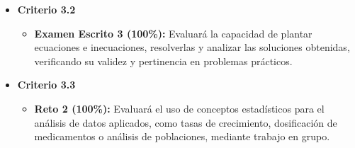 \documentclass[a4,11pt]{aleph-notas}
\begin{document}
\begin{itemize}[leftmargin=*]
    \item \textbf{Criterio 3.2}
        \begin{itemize}[leftmargin=*]
            \item \textbf{Examen Escrito 3 (100\%):} Evaluará la capacidad de plantar ecuaciones e inecuaciones, resolverlas y analizar las soluciones obtenidas, verificando su validez y pertinencia en problemas prácticos.
        \end{itemize}

    \item \textbf{Criterio 3.3}
        \begin{itemize}[leftmargin=*]
            \item \textbf{Reto 2 (100\%):} Evaluará el uso de conceptos estadísticos para el análisis de datos aplicados, como tasas de crecimiento, dosificación de medicamentos o análisis de poblaciones, mediante trabajo en grupo.
        \end{itemize}
\end{itemize}
\end{document}
